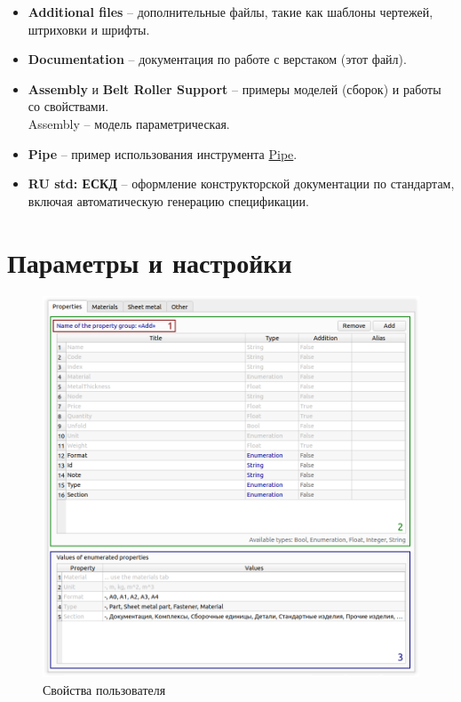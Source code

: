 \documentclass[a4paper,12pt]{article}
\begin{document}
\begin{itemize}
	\item \textbf{Additional files} -- дополнительные файлы, такие как шаблоны чертежей, штриховки и шрифты.
	\item \textbf{Documentation} -- документация по работе с верстаком (этот файл).
	\item \textbf{Assembly} и \textbf{Belt Roller Support} -- примеры моделей (сборок) и работы со свойствами.\\Assembly -- модель параметрическая.
	\item \textbf{Pipe} -- пример использования инструмента \hyperref[sec:9]{Pipe}.
	\item \textbf{RU std: ЕСКД} -- оформление конструкторской документации по стандартам,\\включая автоматическую генерацию спецификации.
\end{itemize}

\pagebreak




\section{Параметры и настройки}

\begin{figure}[htp]
	\centering
	\includegraphics[width=1\textwidth]{img/pref_uProp.png}
	\caption{Свойства пользователя}
	\label{sec:pref_uProp}
\end{figure}
\end{document}

